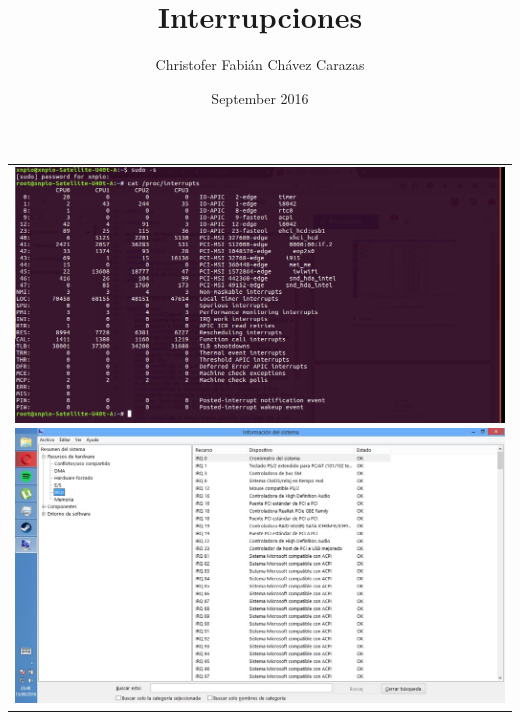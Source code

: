 \documentclass{article}
\title{Interrupciones}
\author{Christofer Fabián Chávez Carazas}
\date{September 2016}
\begin{document}
\begin{table}
\begin{tabular}{c}
\includegraphics[scale=0.5]{linux.png}
\includegraphics[scale=0.5]{windows.jpg}
\end{tabular}
\end{table}
\end{document}
